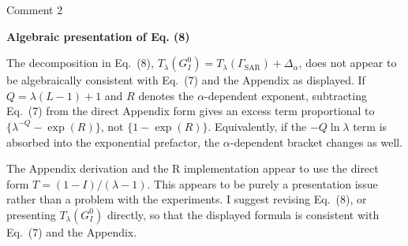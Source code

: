 \documentclass[11pt]{report}
\begin{document}
\vspace{1em}

\begin{reviewbox}{Comment 2}

\textbf{Algebraic presentation of Eq. (8)}

The decomposition in Eq.~(8), $T_\lambda(G^0_I) = T_\lambda(\Gamma_{\mathrm{SAR}}) + \Delta_\alpha$, does not appear to be algebraically consistent with Eq.~(7) and the Appendix as displayed. If $Q = \lambda(L-1)+1$ and $R$ denotes the $\alpha$-dependent exponent, subtracting Eq.~(7) from the direct Appendix form gives an excess term proportional to $\{\lambda^{-Q} - \exp(R)\}$, not $\{1 - \exp(R)\}$. Equivalently, if the $-Q \ln \lambda$ term is absorbed into the exponential prefactor, the $\alpha$-dependent bracket changes as well.

The Appendix derivation and the R implementation appear to use the direct form $T = (1-I)/(\lambda-1)$. This appears to be purely a presentation issue rather than a problem with the experiments. I suggest revising Eq.~(8), or presenting $T_\lambda(G^0_I)$ directly, so that the displayed formula is consistent with Eq.~(7) and the Appendix.

\end{reviewbox}
\end{document}
